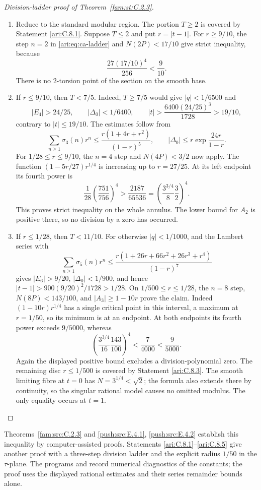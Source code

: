 \begin{proof}[Division-ladder proof of Theorem~\ref{fam:st:C.2.3}]
\begin{enumerate}[label=\arabic*.,leftmargin=*]
\item Reduce to the standard modular region. The portion $T\ge2$
is covered by Statement \ref{ari:C.8.1}. Suppose $T\le2$ and put
$r=|t-1|$. For $r\ge9/10$, the step $n=2$ in
\eqref{ari:eq:ca-ladder} and $N(2P)<17/10$ give strict inequality,
because
\[
 \frac{27(17/10)^4}{256}<\frac9{10}.
\]
There is no $2$-torsion point of the section on the smooth base.

\item If $r\le9/10$, then $T<7/5$. Indeed, $T\ge7/5$ would give
$|q|<1/6500$ and
\[
 |E_4|>24/25,\qquad |\Delta_0|<1/6400,
 \qquad |t|>\frac{6400(24/25)^3}{1728}>19/10,
\]
contrary to $|t|\le19/10$. The estimates follow from
\[
 \sum_{n\ge1}\sigma_3(n)r^n
 \le\frac{r(1+4r+r^2)}{(1-r)^5},\qquad
 |\Delta_0|\le r\exp\frac{24r}{1-r}.
\]
For $1/28\le r\le9/10$, the $n=4$ step and
$N(4P)<3/2$ now apply. The function
$(1-5r/27)r^{1/4}$ is increasing up to $r=27/25$.
At its left endpoint its fourth power is
\[
 \frac1{28}\left(\frac{751}{756}\right)^4
 >\frac{2187}{65536}
 =\left(\frac{3^{3/4}}8\frac32\right)^4.
\]
This proves strict inequality on the whole annulus. The lower
bound for $A_2$ is positive there, so no division by a zero has
occurred.

\item If $r\le1/28$, then $T<11/10$. For otherwise $|q|<1/1000$,
and the Lambert series with
\[
 \sum_{n\ge1}\sigma_5(n)r^n
 \le\frac{r(1+26r+66r^2+26r^3+r^4)}{(1-r)^7}
\]
gives $|E_6|>9/20$, $|\Delta_0|<1/900$, and hence
$|t-1|>900(9/20)^2/1728>1/28$.
On $1/500\le r\le1/28$, the $n=8$ step,
$N(8P)<143/100$, and $|A_3|\ge1-10r$ prove the claim.
Indeed $(1-10r)r^{1/4}$ has a single critical point in this
interval, a maximum at $r=1/50$, so its minimum is at an endpoint.
At both endpoints its fourth power exceeds $9/5000$, whereas
\[
 \left(\frac{3^{3/4}}{16}\frac{143}{100}\right)^4
 <\frac7{4000}<\frac9{5000}.
\]
Again the displayed positive bound excludes a division-polynomial
zero. The remaining disc $r\le1/500$ is covered by Statement
\ref{ari:C.8.3}. The smooth limiting fibre at $t=0$ has
$N=3^{1/4}<\sqrt2$; the formula also extends there by
continuity, so the singular rational model causes no omitted
modulus. The only equality occurs at $t=1$.
\end{enumerate}
\end{proof}

Theorems~\ref{fam:src:C.2.3} and \cref{push:src:E.4.1}, \cref{push:src:E.4.2} establish this inequality by
computer-assisted proofs. Statements \ref{ari:C.8.1}--\ref{ari:C.8.5} give another
proof with a three-step division ladder and the explicit radius
$1/50$ in the $\tau$-plane. The programs
 and
 record numerical diagnostics
of the constants; the proof uses the displayed rational estimates
and their series remainder bounds alone.




